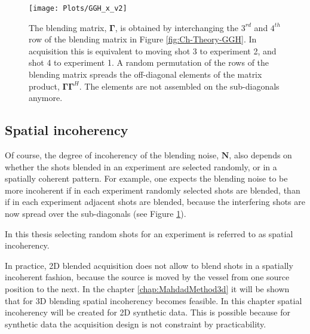 \begin{figure}
	\centering
	\texttt{[image: Plots/GGH\_x\_v2]}
	\caption{The blending matrix, $\mathbf{\Gamma}$, is obtained by interchanging the $3^{rd}$ and $4^{th}$ row of the blending matrix in Figure \ref{fig:Ch-Theory-GGH}. In acquisition this is equivalent to moving shot 3 to experiment 2, and shot 4 to experiment 1. A random permutation of the rows of the blending matrix spreads the off-diagonal elements of the matrix product, $\mathbf{\Gamma\Gamma}^H$. The elements are not assembled on the sub-diagonals anymore.}
	\label{fig:Ch-Theory-GGHx}
\end{figure}

\subsection*{Spatial incoherency}

Of course, the degree of incoherency of the blending noise, $\mathbf{N}$, also depends on whether the shots blended in an experiment are selected randomly, or in a spatially coherent pattern. For example, one expects the blending noise to be more incoherent if in each experiment randomly selected shots are blended, than if in each experiment adjacent shots are blended, because the interfering shots are now spread over the sub-diagonals (see Figure \ref{fig:Ch-Theory-GGHx}).

In this thesis selecting random shots for an experiment is referred to as spatial incoherency.

In practice, 2D blended acquisition does not allow to blend shots in a spatially incoherent fashion, because the source is moved by the vessel from one source position to the next. In the chapter \ref{chap:MahdadMethod3d} it will be shown that for 3D blending spatial incoherency becomes feasible. In this chapter spatial incoherency will be created for 2D synthetic data. This is possible because for synthetic data the acquisition design is not constraint by practicability.



